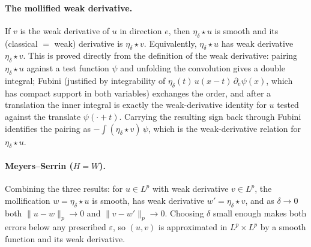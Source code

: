 ﻿\documentclass[12pt, a4paper]{article}
\renewcommand{\_}{\origunderscore\allowbreak}
\theoremstyle{definition}
\theoremstyle{plain}
\begin{document}
\paragraph{The mollified weak derivative.}
If $v$ is the weak derivative of $u$ in direction $e$, then $\eta_\delta\star u$ is smooth and its
(classical $=$ weak) derivative is $\eta_\delta\star v$.  Equivalently, $\eta_\delta\star u$ has weak
derivative $\eta_\delta\star v$.  This is proved directly from the definition of the weak derivative:
pairing $\eta_\delta\star u$ against a test function $\psi$ and unfolding the convolution gives a double
integral; Fubini (justified by integrability of $\eta_\delta(t)\,u(x-t)\,\partial_e\psi(x)$, which has
compact support in both variables) exchanges the order, and after a translation the inner integral is
exactly the weak-derivative identity for $u$ tested against the translate $\psi(\cdot+t)$.  Carrying the
resulting sign back through Fubini identifies the pairing as $-\int(\eta_\delta\star v)\,\psi$, which is
the weak-derivative relation for $\eta_\delta\star u$.

\paragraph{Meyers--Serrin ($H=W$).}
Combining the three results: for $u\in L^p$ with weak derivative $v\in L^p$, the mollification
$w=\eta_\delta\star u$ is smooth, has weak derivative $w'=\eta_\delta\star v$, and as $\delta\to0$ both
$\|u-w\|_p\to0$ and $\|v-w'\|_p\to0$.  Choosing $\delta$ small enough makes both errors below any
prescribed $\varepsilon$, so $(u,v)$ is approximated in $L^p\times L^p$ by a smooth function and its
weak derivative.
\end{document}
